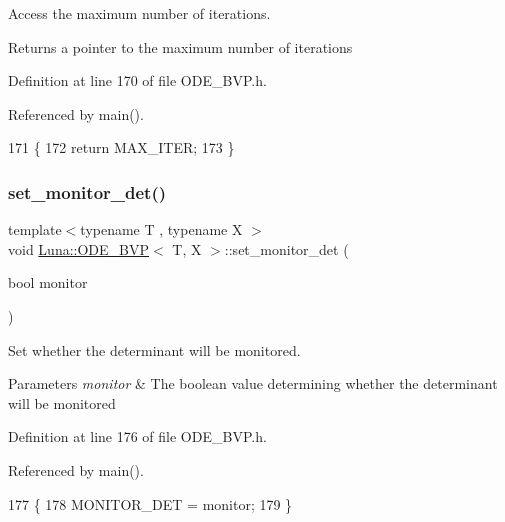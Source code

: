 Access the maximum number of iterations. 

\begin{DoxyReturn}{Returns}
a pointer to the maximum number of iterations 
\end{DoxyReturn}


Definition at line 170 of file O\+D\+E\+\_\+\+B\+V\+P.\+h.



Referenced by main().


\begin{DoxyCode}
171   \{
172     \textcolor{keywordflow}{return} MAX\_ITER;
173   \}
\end{DoxyCode}
\mbox{\label{classLuna_1_1ODE__BVP_a6bf2f309333522cf1a4d251580ee56d5}} 
\subsubsection{\texorpdfstring{set\+\_\+monitor\+\_\+det()}{set\_monitor\_det()}}
{\footnotesize\ttfamily template$<$typename T , typename X $>$ \\
void \hyperlink{classLuna_1_1ODE__BVP}{Luna\+::\+O\+D\+E\+\_\+\+B\+VP}$<$ T, X $>$\+::set\+\_\+monitor\+\_\+det (\begin{DoxyParamCaption}\item[{bool}]{monitor }\end{DoxyParamCaption})}



Set whether the determinant will be monitored. 


\begin{DoxyParams}{Parameters}
{\em monitor} & The boolean value determining whether the determinant will be monitored \\
\hline
\end{DoxyParams}


Definition at line 176 of file O\+D\+E\+\_\+\+B\+V\+P.\+h.



Referenced by main().


\begin{DoxyCode}
177   \{
178     MONITOR\_DET = monitor;
179   \}
\end{DoxyCode}
\mbox{\label{classLuna_1_1ODE__BVP_af869c5d4c32de3e2c6dce128f86379a7}} 
